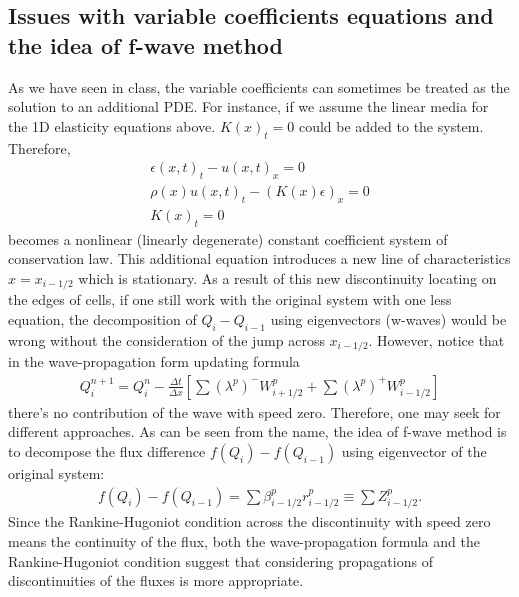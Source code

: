\documentclass{article}
\begin{document}
\subsection{Issues with variable coefficients equations and the idea of f-wave method}
As we have seen in class, the variable coefficients can sometimes be treated as the solution to an additional PDE. For instance, if we assume the linear media for the 1D elasticity equations above. $K(x)_t=0$ could be added to the system. Therefore,
\begin{align*}
\epsilon(x,t)_t-u(x,t)_x=0 \\
\rho(x) u(x,t)_t-(K(x)\epsilon)_x=0 \\
K(x)_t=0
\end{align*}
becomes a nonlinear (linearly degenerate) constant coefficient system of conservation law. This additional equation introduces a new line of characteristics $x=x_{i-1/2}$ which is stationary. As a result of this new discontinuity locating on the edges of cells, if one still work with the original system with one less equation, the decomposition of $Q_i-Q_{i-1}$ using eigenvectors (w-waves) would be wrong without the consideration of the jump across $x_{i-1/2}$. However, notice that in the wave-propagation form updating formula
\begin{align}
Q_i^{n+1}=Q_i^{n}-\frac{\Delta t}{\Delta x}\left[\sum (\lambda^p)^-W_{i+1/2}^p+\sum (\lambda^p)^+ W_{i-1/2}^p\right]
\end{align}
there's no contribution of the wave with speed zero. Therefore, one may seek for different approaches. As can be seen from the name, the idea of f-wave method is to decompose the flux difference $f(Q_i)-f(Q_{i-1})$ using eigenvector of the original system:
\begin{align}
f(Q_i)-f(Q_{i-1})=\sum \beta^p_{i-1/2} r^p_{i-1/2}\equiv \sum Z^p_{i-1/2}.
\end{align}
Since the Rankine-Hugoniot condition across the discontinuity with speed zero means the continuity of the flux, both the wave-propagation formula and the Rankine-Hugoniot condition suggest that considering propagations of discontinuities of the fluxes is more appropriate.
\end{document}
